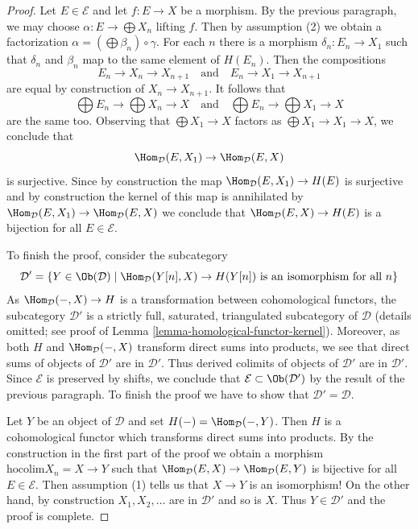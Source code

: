 \begin{proof}
\medskip\noindent
Let $E \in \mathcal{E}$ and let $f : E \to X$ be a morphism.
By the previous paragraph, we may choose $\alpha : E \to \bigoplus X_n$
lifting $f$. Then by assumption (2) we obtain a factorization
$\alpha = (\bigoplus \beta_n) \circ \gamma$.
For each $n$ there is a morphism $\delta_n : E_n \to X_1$ such that
$\delta_n$ and $\beta_n$ map to the same element of $H(E_n)$. Then
the compositions
$$
E_n \to X_n \to X_{n + 1}
\quad\text{and}\quad
E_n \to X_1 \to X_{n + 1}
$$
are equal by construction of $X_n \to X_{n + 1}$. It follows that
$$
\bigoplus E_n \to \bigoplus X_n \to X
\quad\text{and}\quad
\bigoplus E_n \to \bigoplus X_1 \to X
$$
are the same too. Observing that $\bigoplus X_1 \to X$ factors
as $\bigoplus X_1 \to X_1 \to X$, we conclude that
$$
\Hom_\mathcal{D}(E, X_1) \to \Hom_\mathcal{D}(E, X)
$$
is surjective. Since by construction the map
$\Hom_\mathcal{D}(E, X_1) \to H(E)$ is surjective and by
construction the kernel of this map is annihilated by
$\Hom_\mathcal{D}(E, X_1) \to \Hom_\mathcal{D}(E, X)$
we conclude that $\Hom_\mathcal{D}(E, X) \to H(E)$ is
a bijection for all $E \in \mathcal{E}$.

\medskip\noindent
To finish the proof, consider the subcategory
$$
\mathcal{D}' =
\{Y \in \Ob(\mathcal{D}) \mid \Hom_\mathcal{D}(Y[n], X) \to H(Y[n])
\text{ is an isomorphism for all }n\}
$$
As $\Hom_\mathcal{D}(-, X) \to H$ is a transformation between
cohomological functors,
the subcategory $\mathcal{D}'$ is a strictly full, saturated, triangulated
subcategory of $\mathcal{D}$ (details omitted; see proof of
Lemma \ref{lemma-homological-functor-kernel}). Moreover, as both
$H$ and $\Hom_\mathcal{D}(-, X)$ transform direct sums into products,
we see that direct sums of objects of $\mathcal{D}'$ are in $\mathcal{D}'$.
Thus derived colimits of objects of $\mathcal{D}'$ are in $\mathcal{D}'$.
Since $\mathcal{E}$ is preserved by shifts, we conclude that
$\mathcal{E} \subset \Ob(\mathcal{D}')$ by the result of the
previous paragraph. To finish the proof we have to show that
$\mathcal{D}' = \mathcal{D}$.

\medskip\noindent
Let $Y$ be an object of $\mathcal{D}$ and set $H(-) = \Hom_\mathcal{D}(-, Y)$.
Then $H$ is a cohomological functor which transforms direct sums into products.
By the construction in the first part of the proof we obtain a morphism
$\text{hocolim} X_n = X \to Y$ such that
$\Hom_\mathcal{D}(E, X) \to \Hom_\mathcal{D}(E, Y)$ is bijective for all
$E \in \mathcal{E}$. Then assumption (1) tells us that $X \to Y$ is an
isomorphism! On the other hand, by construction $X_1, X_2, \ldots$
are in $\mathcal{D}'$ and so is $X$. Thus $Y \in \mathcal{D}'$ and
the proof is complete.
\end{proof}

